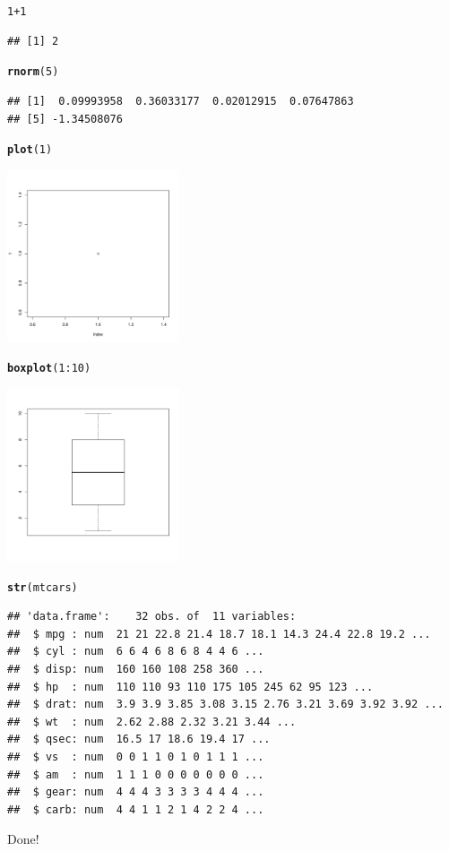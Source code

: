 \documentclass{article}\usepackage[]{graphicx}\usepackage[]{color}
\makeatletter
\newcommand{\hlnum}[1]{\textcolor[rgb]{0.686,0.059,0.569}{#1}}%
\newcommand{\hlopt}[1]{\textcolor[rgb]{0,0,0}{#1}}%
\newcommand{\hlstd}[1]{\textcolor[rgb]{0.345,0.345,0.345}{#1}}%
\newcommand{\hlkwd}[1]{\textcolor[rgb]{0.737,0.353,0.396}{\textbf{#1}}}%
\newenvironment{kframe}{%
 \def\at@end@of@kframe{}%
 \ifinner\ifhmode%
  \def\at@end@of@kframe{\end{minipage}}%
  \begin{minipage}{\columnwidth}%
 \fi\fi%
 \def\FrameCommand##1{\hskip\@totalleftmargin \hskip-\fboxsep
 \colorbox{shadecolor}{##1}\hskip-\fboxsep
     \hskip-\linewidth \hskip-\@totalleftmargin \hskip\columnwidth}%
 \MakeFramed {\advance\hsize-\width
   \@totalleftmargin\z@ \linewidth\hsize
   \@setminipage}}%
 {\par\unskip\endMakeFramed%
 \at@end@of@kframe}
\newenvironment{knitrout}{}{} %
\makeatother
\begin{document}
\begin{knitrout}
\color{fgcolor}\begin{kframe}
\begin{alltt}
\hlnum{1}\hlopt{+}\hlnum{1}
\end{alltt}
\begin{verbatim}
## [1] 2
\end{verbatim}
\begin{alltt}
\hlkwd{rnorm}\hlstd{(}\hlnum{5}\hlstd{)}
\end{alltt}
\begin{verbatim}
## [1]  0.09993958  0.36033177  0.02012915  0.07647863
## [5] -1.34508076
\end{verbatim}
\begin{alltt}
\hlkwd{plot}\hlstd{(}\hlnum{1}\hlstd{)}
\end{alltt}
\end{kframe}
\includegraphics[width=2in]{figure/test-child-1} 
\begin{kframe}\begin{alltt}
\hlkwd{boxplot}\hlstd{(}\hlnum{1}\hlopt{:}\hlnum{10}\hlstd{)}
\end{alltt}
\end{kframe}
\includegraphics[width=2in]{figure/test-child-2} 
\begin{kframe}\begin{alltt}
\hlkwd{str}\hlstd{(mtcars)}
\end{alltt}
\begin{verbatim}
## 'data.frame':	32 obs. of  11 variables:
##  $ mpg : num  21 21 22.8 21.4 18.7 18.1 14.3 24.4 22.8 19.2 ...
##  $ cyl : num  6 6 4 6 8 6 8 4 4 6 ...
##  $ disp: num  160 160 108 258 360 ...
##  $ hp  : num  110 110 93 110 175 105 245 62 95 123 ...
##  $ drat: num  3.9 3.9 3.85 3.08 3.15 2.76 3.21 3.69 3.92 3.92 ...
##  $ wt  : num  2.62 2.88 2.32 3.21 3.44 ...
##  $ qsec: num  16.5 17 18.6 19.4 17 ...
##  $ vs  : num  0 0 1 1 0 1 0 1 1 1 ...
##  $ am  : num  1 1 1 0 0 0 0 0 0 0 ...
##  $ gear: num  4 4 4 3 3 3 3 4 4 4 ...
##  $ carb: num  4 4 1 1 2 1 4 2 2 4 ...
\end{verbatim}
\end{kframe}
\end{knitrout}

Done!
\end{document}
